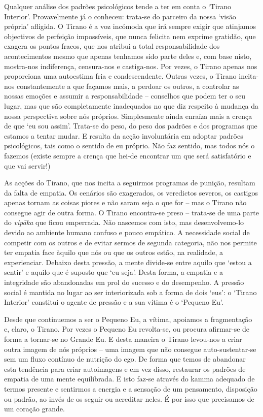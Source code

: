 Qualquer análise dos padrões psicológicos tende a ter em conta o `Tirano
Interior'. Provavelmente já o conheceu: trata-se do parceiro da nossa `visão
própria' afligida. O Tirano é a voz incómoda que irá sempre exigir que atinjamos
objectivos de perfeição impossíveis, que nunca felicita nem exprime gratidão,
que exagera os pontos fracos, que nos atribui a total responsabilidade dos
acontecimentos mesmo que apenas tenhamos sido parte deles e, com base nisto,
mostra-nos indiferença, censura-nos e castiga-nos. Por vezes, o Tirano apenas
nos proporciona uma autoestima fria e condescendente. Outras vezes, o Tirano
incita-nos constantemente a que façamos mais, a perdoar os outros, a controlar
as nossas emoções e assumir a responsabilidade -- conselhos que podem ter o seu
lugar, mas que são completamente inadequados no que diz respeito à mudança da
nossa perspectiva sobre nós próprios. Simplesmente ainda enraíza mais a crença
de que `eu sou assim'. Trata-se do peso, do peso dos padrões e dos programas que
estamos a tentar mudar. E resulta da acção involuntária em adoptar padrões
psicológicos, tais como o sentido de eu próprio. Não faz sentido, mas todos nós
o fazemos (existe sempre a crença que hei-de encontrar um que será satisfatório
e que vai servir!)

As acções do Tirano, que nos incita a seguirmos programas de punição, resultam
da falta de empatia. Os cenários são exagerados, os veredictos severos, os
castigos apenas tornam as coisas piores e não saram seja o que for -- mas o
Tirano não consegue agir de outra forma. O Tirano encontra-se preso -- trata-se
de uma parte do \emph{vipāka} que ficou emperrada. Não nascemos com isto, mas
desenvolvemo-lo devido ao ambiente humano confuso e pouco empático. A
necessidade social de competir com os outros e de evitar sermos de segunda
categoria, não nos permite ter empatia face àquilo que nós ou que os outros
estão, na realidade, a experienciar. Debaixo desta pressão, a mente divide-se
entre aquilo que `estou a sentir' e aquilo que é suposto que `eu seja'. Desta
forma, a empatia e a integridade são abandonadas em prol do sucesso e do
desempenho. A pressão social é mantida no lugar ao ser interiorizada sob a forma
de dois `eus': o `Tirano Interior' constitui o agente de pressão e a sua vítima
é o `Pequeno Eu'.

Desde que continuemos a ser o Pequeno Eu, a vítima, apoiamos a fragmentação e,
claro, o Tirano. Por vezes o Pequeno Eu revolta-se, ou procura afirmar-se de
forma a tornar-se no Grande Eu. E desta maneira o Tirano levou-nos a criar outra
imagem de nós próprios -- uma imagem que não consegue auto-sustentar-se sem um
fluxo contínuo de nutrição do ego. De forma que temos de abandonar esta
tendência para criar autoimagens e em vez disso, restaurar os padrões de empatia
de uma mente equilibrada. E isto faz-se através do kamma adequado de termos
presente e sentirmos a energia e a sensação de um pensamento, disposição ou
padrão, ao invés de os seguir ou acreditar neles. É por isso que precisamos de
um coração grande.

